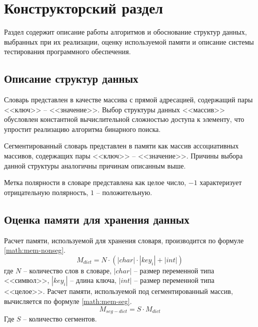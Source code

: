 \chapter{Конструкторский раздел}\label{sec:design}
Раздел содержит описание работы алгоритмов и обоснование структур данных, выбранных при их реализации, оценку используемой памяти и описание системы тестирования программного обеспечения.

\section{Описание структур данных}
Словарь представлен в качестве массива с прямой адресацией, содержащий пары <<ключ>> -- <<значение>>. Выбор структуры данных <<массив>> обусловлен константной вычислительной сложностью доступа к элементу, что упростит реализацию алгоритма бинарного поиска.

Сегментированный словарь представлен в памяти как массив ассоциативных массивов, содержащих пары <<ключ>> -- <<значение>>. Причины выбора данной структуры аналогичны причинам описанным выше.

Метка полярности в словаре представлена как целое число, $-1$ характеризует отрицательную полярность, $1$ -- положительную.

\section{Оценка памяти для хранения данных}

Расчет памяти, используемой для хранения словаря, производится по формуле \ref{math:mem-nonseg}.
\begin{equation}\label{math:mem-nonseg}
	M_{dict} = N \cdot (|char| \cdot |key_i| + |int|)
\end{equation}
где $N$ -- количество слов в словаре, $|char|$ -- размер переменной типа <<символ>>, $|key_i|$ -- длина ключа, $|int|$ --  размер переменной типа <<целое>>.
Расчет памяти, используемой под сегментированный массив, вычисляется по формуле \ref{math:mem-seg}.
\begin{equation}\label{math:mem-seg}
	M_{seg-dict} = S \cdot M_{dict}
\end{equation}
Где $S$ -- количество сегментов.

